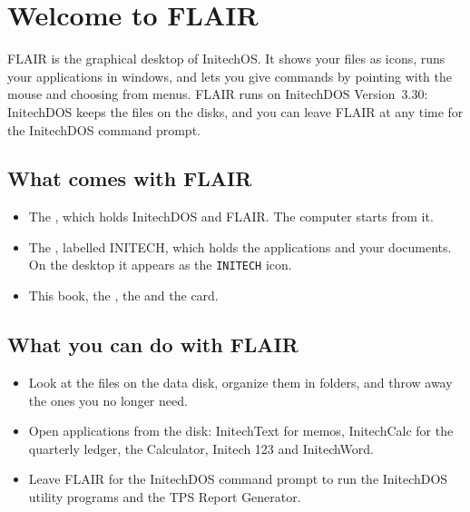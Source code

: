 \chapter{Welcome to FLAIR}

FLAIR is the graphical desktop of InitechOS.  It shows your files as
icons, runs your applications in windows, and lets you give commands by
pointing with the mouse and choosing from menus.  FLAIR runs on InitechDOS
Version~3.30: InitechDOS keeps the files on the disks, and you can leave
FLAIR at any time for the InitechDOS command prompt.


\section{What comes with FLAIR}
\begin{itemize}
\item The , which holds InitechDOS and FLAIR.  The
  computer starts from it.
\item The , labelled INITECH, which holds the applications
  and your documents.  On the desktop it appears as the \texttt{INITECH}
  icon.
\item This book, the , the  and the  card.
\end{itemize}

\section{What you can do with FLAIR}
\begin{itemize}
\item Look at the files on the data disk, organize them in folders, and
  throw away the ones you no longer need.
\item Open applications from the disk: InitechText for memos, InitechCalc
  for the quarterly ledger, the Calculator, Initech 123 and InitechWord.
\item Leave FLAIR for the InitechDOS command prompt to run the InitechDOS
  utility programs and the TPS Report Generator.
\end{itemize}
